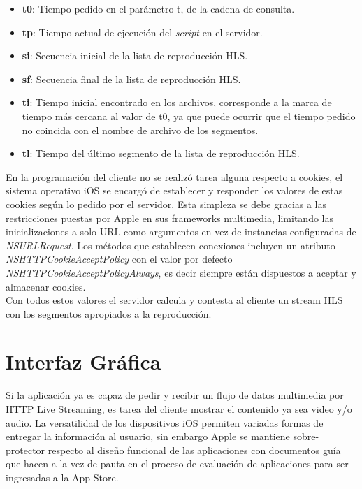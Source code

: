\begin{itemize}
\item \textbf{t0}: Tiempo pedido en el parámetro t, de la cadena de consulta.
\item \textbf{tp}: Tiempo actual de ejecución del \textit{script} en el servidor.
\item \textbf{si}: Secuencia inicial de la lista de reproducción HLS.
\item \textbf{sf}: Secuencia final de la lista de reproducción HLS.
\item \textbf{ti}: Tiempo inicial encontrado en los archivos, corresponde a la marca de tiempo más cercana al valor de t0, ya que puede ocurrir que el tiempo pedido no coincida con el nombre de archivo de los segmentos.
\item \textbf{tl}: Tiempo del último segmento de la lista de reproducción HLS.

\end{itemize}
 
En la programación del cliente no se realizó tarea alguna respecto a cookies, el sistema operativo iOS se encargó de establecer y responder los valores de estas cookies según lo pedido por el servidor. Esta simpleza se debe gracias a las restricciones puestas por Apple en sus frameworks multimedia, limitando las inicializaciones a solo URL como argumentos en vez de instancias configuradas de \textit{NSURLRequest}. 
Los métodos que establecen conexiones incluyen un atributo \textit{NSHTTPCookieAcceptPolicy} con el valor por defecto \textit{NSHTTPCookieAcceptPolicyAlways}, es decir siempre están dispuestos a aceptar y almacenar cookies. \\

Con todos estos valores el servidor calcula y contesta al cliente un stream HLS con los segmentos apropiados a la reproducción.
	
	
\clearpage
\section{Interfaz Gráfica}

Si la aplicación ya es capaz de pedir y recibir un flujo de datos multimedia por HTTP Live Streaming, es tarea del cliente mostrar el contenido ya sea video y/o audio. La versatilidad de los dispositivos iOS permiten variadas formas de entregar la información al usuario, sin embargo Apple se mantiene sobre-protector respecto al diseño funcional de las aplicaciones con documentos guía que hacen a la vez de pauta en el proceso de evaluación de aplicaciones para ser ingresadas a la App Store.

